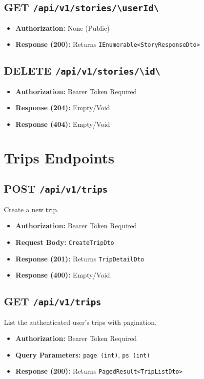 \subsection{GET \texttt{/api/v1/stories/\textbackslash{}{userId\textbackslash{}}}}
\begin{itemize}
    \item \textbf{Authorization:} None (Public)
    \item \textbf{Response (200):} Returns \texttt{IEnumerable<StoryResponseDto>}
\end{itemize}

\subsection{DELETE \texttt{/api/v1/stories/\textbackslash{}{id\textbackslash{}}}}
\begin{itemize}
    \item \textbf{Authorization:} Bearer Token Required
    \item \textbf{Response (204):} Empty/Void
    \item \textbf{Response (404):} Empty/Void
\end{itemize}

\section{Trips Endpoints}

\subsection{POST \texttt{/api/v1/trips}}
Create a new trip.
\begin{itemize}
    \item \textbf{Authorization:} Bearer Token Required
    \item \textbf{Request Body:} \texttt{CreateTripDto}
    \item \textbf{Response (201):} Returns \texttt{TripDetailDto}
    \item \textbf{Response (400):} Empty/Void
\end{itemize}

\subsection{GET \texttt{/api/v1/trips}}
List the authenticated user's trips with pagination.
\begin{itemize}
    \item \textbf{Authorization:} Bearer Token Required
    \item \textbf{Query Parameters:} \texttt{page (int)}, \texttt{ps (int)}
    \item \textbf{Response (200):} Returns \texttt{PagedResult<TripListDto>}
\end{itemize}


